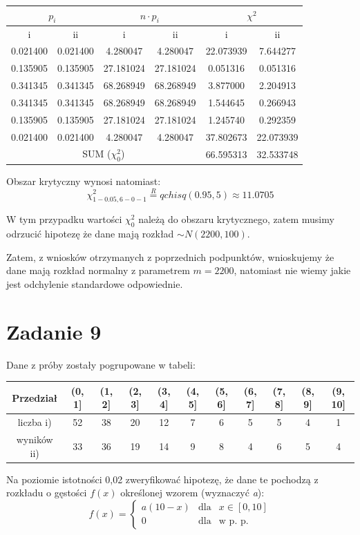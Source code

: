 \documentclass{article}
\begin{document}
\begin{center} \begin{tabular}{|c|c|c|c|c|c|} \hline
\multicolumn{2}{|c|}{$p_i$} & \multicolumn{2}{|c|}{$n \cdot p_i$} & \multicolumn{2}{|c|}{$\chi^2$} \\ \hline
i & ii & i & ii & i & ii \\ \hline
0.021400 & 0.021400 & 4.280047 & 4.280047 & 22.073939 & 7.644277 \\ \hline
0.135905 & 0.135905 & 27.181024 & 27.181024 & 0.051316 & 0.051316 \\ \hline
0.341345 & 0.341345 & 68.268949 & 68.268949 & 3.877000 & 2.204913 \\ \hline
0.341345 & 0.341345 & 68.268949 & 68.268949 & 1.544645 & 0.266943 \\ \hline
0.135905 & 0.135905 & 27.181024 & 27.181024 & 1.245740 & 0.292359 \\ \hline
0.021400 & 0.021400 & 4.280047 & 4.280047 & 37.802673 & 22.073939 \\ \hline		
\multicolumn{4}{|c|}{SUM ($\chi^2_0$)} & 66.595313	& 32.533748 \\ \hline
\end{tabular} \end{center}

Obszar krytyczny wynosi natomiast:
\[ \chi^2_{1-0.05,6-0-1} \overset{R}{=} qchisq(0.95, 5) \approx 11.0705 \]

W tym przypadku wartości $\chi^2_0$ należą do obszaru krytycznego, zatem musimy odrzucić hipotezę że dane mają rozkład $\sim N(2200, 100)$. \\ \par

Zatem, z wniosków otrzymanych z poprzednich podpunktów, wnioskujemy że dane mają rozkład normalny z parametrem $m = 2200$, natomiast nie wiemy jakie jest odchylenie standardowe odpowiednie.

\newpage
\section{Zadanie 9}
Dane z próby zostały pogrupowane w tabeli:
\begin{flushleft} \scriptsize \begin{tabular}{|c|c|c|c|c|c|c|c|c|c|c|} \hline
Przedział & (0, 1] & (1, 2] & (2, 3] & (3, 4] & (4, 5] & (5, 6] & (6, 7] & (7, 8] & (8, 9] & (9, 10] \\ \hline
liczba i) &
52 & 38 & 20 & 12 & 7 & 6 & 5 & 5 & 4 & 1 \\ \cline{2-11}
wyników ii) & 33 & 36 & 19 & 14 & 9 & 8 & 4 & 6 & 5 & 4 \\ \hline
\end{tabular} \end{flushleft}
Na poziomie istotności 0,02 zweryfikować hipotezę, że dane te
pochodzą z rozkładu o gęstości $f(x)$ określonej wzorem (wyznaczyć \textit{a}):
\[ f(x) = \left\{ \begin{array}{ccc} 
a(10 - x) & \text{dla} & x \in [0,10] \\
0 & \text{dla} & \text{w p. p.} 
\end{array} \right. \]
\end{document}
